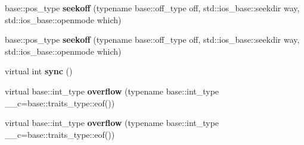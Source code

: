 \begin{DoxyCompactItemize}
base\+::pos\+\_\+type {\bfseries seekoff} (typename base\+::off\+\_\+type off, std\+::ios\+\_\+base\+::seekdir way, std\+::ios\+\_\+base\+::openmode which)
\item 
\mbox{\label{structtestbuf_a0bf3839a4f8c118fc41e0514a7f79a1e}} 
base\+::pos\+\_\+type {\bfseries seekoff} (typename base\+::off\+\_\+type off, std\+::ios\+\_\+base\+::seekdir way, std\+::ios\+\_\+base\+::openmode which)
\item 
\mbox{\label{structtestbuf_a0b5673fd18dc4f85aff8adbc8142ec79}} 
virtual int {\bfseries sync} ()
\item 
\mbox{\label{structtestbuf_a1d33d01e5a3f18a1fa4407c67eb87f52}} 
virtual base\+::int\+\_\+type {\bfseries overflow} (typename base\+::int\+\_\+type \+\_\+\+\_\+c=base\+::traits\+\_\+type\+::eof())
\item 
\mbox{\label{structtestbuf_a1d33d01e5a3f18a1fa4407c67eb87f52}} 
virtual base\+::int\+\_\+type {\bfseries overflow} (typename base\+::int\+\_\+type \+\_\+\+\_\+c=base\+::traits\+\_\+type\+::eof())
\end{DoxyCompactItemize}


